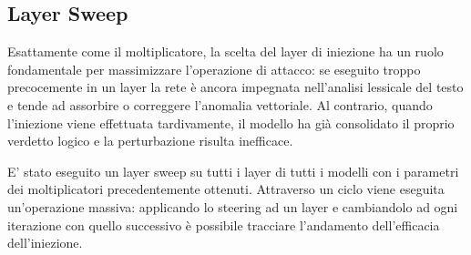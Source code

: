 \subsection{Layer Sweep}
Esattamente come il moltiplicatore, la scelta del layer di iniezione ha un ruolo fondamentale per massimizzare l'operazione di attacco: se eseguito troppo precocemente in un layer la rete è ancora impegnata nell'analisi lessicale del testo e tende ad assorbire o correggere l'anomalia vettoriale.
Al contrario, quando l'iniezione viene effettuata tardivamente, il modello ha già consolidato il proprio verdetto logico e la perturbazione risulta inefficace.

E' stato eseguito un layer sweep su tutti i layer di tutti i modelli con i parametri dei moltiplicatori precedentemente ottenuti. Attraverso un ciclo viene eseguita un'operazione massiva: applicando lo steering ad un layer e cambiandolo ad ogni iterazione con quello successivo è possibile tracciare l'andamento dell'efficacia dell'iniezione.

